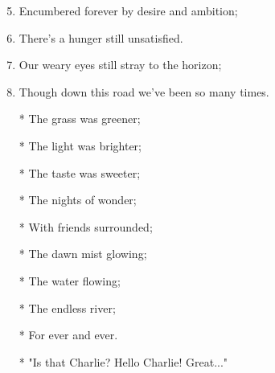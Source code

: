 \documentclass{article}
\begin{document}
\begin{center}
\begin{enumerate}
            \item[]
            \item[] \instrumental

            \item[]
            \item[] 
            \item Encumbered forever by desire and ambition;
            \item There's a hunger still unsatisfied.
            \item Our weary eyes still stray to the horizon;
            \item Though down this road we've been so many times.
            
            \item[]
            \item[] \chorus
            \item[*] The grass was greener;
            \item[*] The light was brighter;
            \item[*] The taste was sweeter;
            \item[*] The nights of wonder;
            \item[*] With friends surrounded;
            \item[*] The dawn mist glowing;
            \item[*] The water flowing;
            \item[*] The endless river;
            \item[*] For ever and ever.

            \item[]
            \item[] \instrumental

            \item[]
            \item[] \outro
            \item[*] "Is that Charlie? Hello Charlie! Great..."

        \end{enumerate}
    \end{center}
\end{document}
